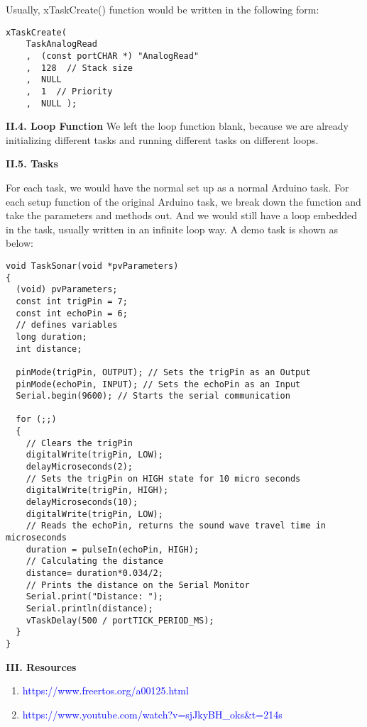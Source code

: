 \documentclass[a4paper,12pt]{report}
\begin{document}
\noindent
Usually, xTaskCreate() function would be written in the following form:
\begin{lstlisting}[style=CStyle]
xTaskCreate(
    TaskAnalogRead
    ,  (const portCHAR *) "AnalogRead"
    ,  128  // Stack size
    ,  NULL
    ,  1  // Priority
    ,  NULL );
\end{lstlisting}

\noindent
\textbf{II.4. Loop Function}
We left the loop function blank, because we are already initializing different tasks and running different tasks on different loops. 

\noindent
\textbf{II.5. Tasks}

\noindent
For each task, we would have the normal set up as a normal Arduino task. For each setup function of the original Arduino task, we break down the function and take the parameters and methods out. And we would still have a loop embedded in the task, usually written in an infinite loop way. A demo task is shown as below:

\begin{lstlisting}[style=CStyle]
void TaskSonar(void *pvParameters)
{
  (void) pvParameters;
  const int trigPin = 7;
  const int echoPin = 6;
  // defines variables
  long duration;
  int distance;

  pinMode(trigPin, OUTPUT); // Sets the trigPin as an Output
  pinMode(echoPin, INPUT); // Sets the echoPin as an Input
  Serial.begin(9600); // Starts the serial communication
  
  for (;;)
  {
    // Clears the trigPin
    digitalWrite(trigPin, LOW);
    delayMicroseconds(2);
    // Sets the trigPin on HIGH state for 10 micro seconds
    digitalWrite(trigPin, HIGH);
    delayMicroseconds(10);
    digitalWrite(trigPin, LOW);
    // Reads the echoPin, returns the sound wave travel time in microseconds
    duration = pulseIn(echoPin, HIGH);
    // Calculating the distance
    distance= duration*0.034/2;
    // Prints the distance on the Serial Monitor
    Serial.print("Distance: ");
    Serial.println(distance);
    vTaskDelay(500 / portTICK_PERIOD_MS);
  }
}
\end{lstlisting}

\pagebreak
\noindent
\textbf{III. Resources}

\begin{enumerate}
\item \textcolor{blue}{https://www.freertos.org/a00125.html}
\item \textcolor{blue}{https://www.youtube.com/watch?v=sjJkyBH\_oks\&t=214s}
\end{enumerate}
\end{document}
